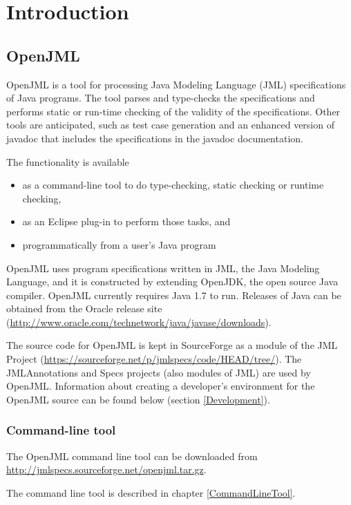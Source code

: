 \chapter{Introduction}

\section{OpenJML}

OpenJML is a tool for processing Java Modeling Language (JML) specifications of Java programs. 
The tool parses and type-checks the specifications and
performs static or run-time checking of the validity of the specifications. 
Other tools are anticipated, such as test case generation and
 an enhanced version of javadoc that includes the specifications in the
javadoc documentation.

The functionality is available 
\begin{itemize}
\item as a command-line tool to do type-checking, static checking or runtime checking,
\item as an Eclipse plug-in to perform those tasks, and
\item programmatically from a user's Java program
\end{itemize}

OpenJML uses program specifications written in JML, the Java Modeling Language, and
it is constructed by extending OpenJDK, the open source Java compiler.
OpenJML currently requires Java 1.7 to run.
Releases of Java can be obtained from the Oracle release site (\url{http://www.oracle.com/technetwork/java/javase/downloads}).

The source code for OpenJML is kept in SourceForge as a module of the 
JML Project (\url{https://sourceforge.net/p/jmlspecs/code/HEAD/tree/}).
The JMLAnnotations and Specs projects (also modules of JML) are used by OpenJML.
Information about creating a developer's environment for the OpenJML source
can be found below (section \ref{Development}).
 
\subsection{Command-line tool}

The OpenJML command line tool can be downloaded from
\url{http://jmlspecs.sourceforge.net/openjml.tar.gz}.

The command line tool is described in chapter \ref{CommandLineTool}.

